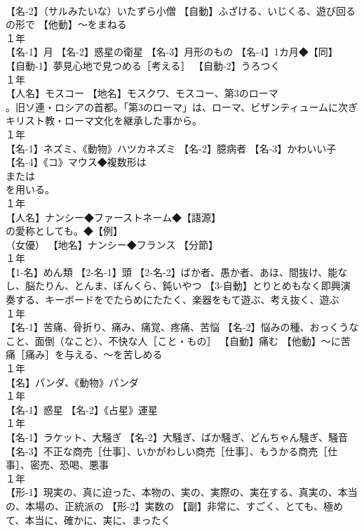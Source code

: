\documentclass[8pt]{extreport}
\begin{document}
\begin{CJK}{UTF8}{min}
\\	【名-2】（サルみたいな）いたずら小僧 【自動】ふざける、いじくる、遊び回る
\\	の形で 【他動】～をまねる
\\	１年	
\\	【名-1】月 【名-2】惑星の衛星 【名-3】月形のもの 【名-4】1カ月◆【同】
\\	【自動-1】夢見心地で見つめる［考える］ 【自動-2】うろつく
\\	１年	
\\	【人名】モスコー 【地名】モスクワ、モスコー、第3のローマ
\\	。旧ソ連・ロシアの首都。「第3のローマ」は、ローマ、ビザンティュームに次ぎキリスト教・ローマ文化を継承した事から。
\\	１年	
\\	【名-1】ネズミ、《動物》ハツカネズミ 【名-2】臆病者 【名-3】かわいい子 【名-4】《コ》マウス◆複数形は 
\\	または 
\\	を用いる。
\\	１年	
\\	【人名】ナンシー◆ファーストネーム◆【語源】
\\	の愛称としても。◆【例】
\\	（女優） 【地名】ナンシー◆フランス 【分節】
\\	１年	
\\	【1-名】めん類 【2-名-1】頭 【2-名-2】ばか者、愚か者、あほ、間抜け、能なし、脳たりん、とんま、ぼんくら、鈍いやつ 【3-自動】とりとめもなく即興演奏する、キーボードをでたらめにたたく、楽器をもて遊ぶ、考え抜く、遊ぶ
\\	１年	
\\	【名-1】苦痛、骨折り、痛み、痛覚、疼痛、苦悩 【名-2】悩みの種、おっくうなこと、面倒（なこと）、不快な人［こと・もの］ 【自動】痛む 【他動】～に苦痛［痛み］を与える、～を苦しめる
\\	１年	
\\	【名】パンダ、《動物》パンダ
\\	１年	
\\	【名-1】惑星 【名-2】《占星》運星
\\	１年	
\\	【名-1】ラケット、大騒ぎ 【名-2】大騒ぎ、ばか騒ぎ、どんちゃん騒ぎ、騒音 【名-3】不正な商売［仕事］、いかがわしい商売［仕事］、もうかる商売［仕事］、密売、恐喝、悪事
\\	１年	
\\	【形-1】現実の、真に迫った、本物の、実の、実際の、実在する、真実の、本当の、本場の、正統派の 【形-2】実数の 【副】非常に、すごく、とても、極めて、本当に、確かに、実に、まったく

\end{CJK}
\end{document}
